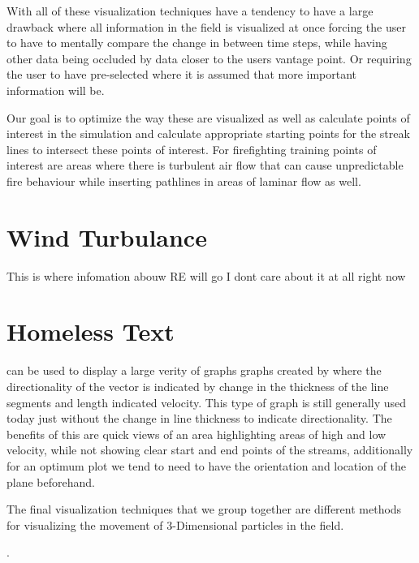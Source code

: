 With all of these visualization techniques have a tendency to have a large drawback where all information in the field is visualized at once  forcing the user to have to mentally compare the change in between time steps, while having other data being occluded by data closer to the users vantage point. Or requiring the user to have pre-selected where it is assumed that more important information will be. 


Our goal is to optimize the way these are visualized as well as calculate points of interest in the simulation and calculate appropriate starting points for the streak lines to intersect these points of interest. For firefighting training points of interest are areas where there is turbulent air flow that can cause unpredictable fire behaviour while inserting pathlines in areas of laminar flow as well.


\section{Wind Turbulance}

This is where infomation abouw RE will go  I dont care about it at all right now

\section{Homeless Text}
can be used to display a large verity of graphs graphs created by {} where the directionality of the vector is indicated by change in the thickness of the line segments and length indicated velocity. This type of graph is still generally used today just without the change in line thickness to indicate  directionality. \cite{567777} The benefits of this are quick views of an area highlighting areas of high and low velocity, while not showing clear start and end points of the streams, additionally for an optimum plot we tend to need to have the orientation and location of the plane beforehand. 



 

The final visualization techniques that we group together are different methods for visualizing the movement of 3-Dimensional particles in the field.



. 

